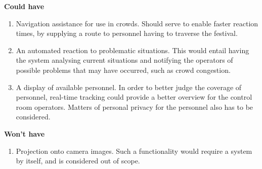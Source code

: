 \textbf{Could have}
\begin{enumerate}[resume]
    \item Navigation assistance for use in crowds. Should serve to enable faster reaction times, by supplying a route to personnel having to traverse the festival.
    \item An automated reaction to problematic situations. This would entail having the system analysing current situations and notifying the operators of possible problems that may have occurred, such as crowd congestion.
    \item A display of available personnel. In order to better judge the coverage of personnel, real-time tracking could provide a better overview for the control room operators. Matters of personal privacy for the personnel also has to be considered.
\end{enumerate}

\textbf{Won't have}
\begin{enumerate}[resume]
    \item Projection onto camera images. Such a functionality would require a system by itself, and is considered out of scope.
\end{enumerate}
\fi

